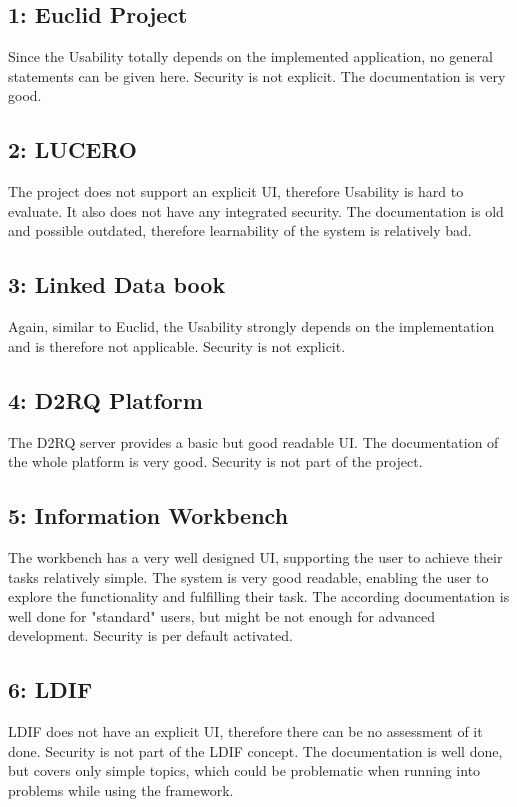 \subsection*{1: Euclid Project}
Since the Usability totally depends on the implemented application, no general statements can be given here. Security is not explicit. The documentation is very good.

\subsection*{2: LUCERO}
The project does not support an explicit UI, therefore Usability is hard to evaluate. It also does not have any integrated security. The documentation is old and possible outdated, therefore learnability of the system is relatively bad.

\subsection*{3: Linked Data book}
Again, similar to Euclid, the Usability strongly depends on the implementation and is therefore not applicable. Security is not explicit.

\subsection*{4: D2RQ Platform}
The D2RQ server provides a basic but good readable UI. The documentation of the whole platform is very good. Security is not part of the project.

\subsection*{5: Information Workbench}
The workbench has a very well designed UI, supporting the user to achieve their tasks relatively simple. The system is very good readable, enabling the user to explore the functionality and fulfilling their task. The according documentation is well done for "standard" users, but might be not enough for advanced development. Security is per default activated.

\subsection*{6: LDIF}
LDIF does not have an explicit UI, therefore there can be no assessment of it done. Security is not part of the LDIF concept. The documentation is well done, but covers only simple topics, which could be problematic when running into problems while using the framework.

